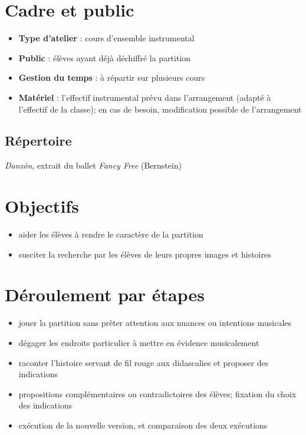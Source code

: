 \documentclass[a4paper,11pt,bibliography=totoc,numbers=noenddot,listof=flat,DIV=11,BCOR=0mm]{scrreprt}%
\begin{document}
\section*{Cadre et public}
\begin{itemize}
\item [\textbullet]\textbf{Type d'atelier} : cours d'ensemble instrumental
\item [\textbullet]\textbf{Public} : élèves ayant déjà déchiffré la partition
\item [\textbullet]\textbf{Gestion du temps} : à répartir sur plusieurs cours
\item [\textbullet]\textbf{Matériel} : l'effectif instrumental prévu dans l'arrangement (adapté à l'effectif de la classe); en cas de besoin, modification possible de l'arrangement
\end{itemize}



\subsection*{Répertoire}
\emph{Danzón}, extrait du ballet \emph{Fancy Free} (Bernstein)


\section*{Objectifs}
\begin{itemize}
\item aider les élèves à rendre le caractère de la partition
\item susciter la recherche par les élèves de leurs propres images et histoires
\end{itemize}


\section*{Déroulement par étapes}
\begin{itemize}
\item jouer la partition sans prêter attention aux nuances ou intentions musicales
\item dégager les endroits particulier à mettre en évidence musicalement
\item raconter l'histoire servant de fil rouge aux didascalies et proposer des indications
\item propositions complémentaires ou contradictoires des élèves; fixation du choix des indications
\item exécution de la nouvelle version, et comparaison des deux exécutions
\end{itemize}
\end{document}
